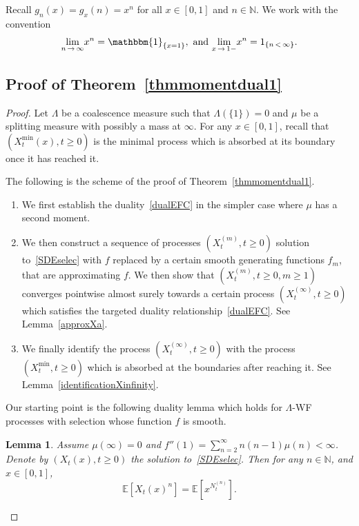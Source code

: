 \documentclass[10pt]{amsart}
\newtheorem{lemm}[theo]{Lemma}\newtheorem{prop}[theo]{Proposition}\newtheorem{coro}[theo]{Corollary}\newtheorem{conj}[theo]{Conjecture}
\theoremstyle{definition}\newtheorem{defi}[theo]{Definition}\newtheorem{rema}[theo]{Remark}\newtheorem{exam}[theo]{Example}\newtheorem{exem}[theo]{Example}\newtheorem{nota}[theo]{Notation}
\newcommand{\bbmun}{\mathbbm{1}}
\newcommand{\bbN}{\mathbb{N}}
\newcommand{\bbE}{\mathbb{E}}
\begin{document}
Recall $g_n(x)=g_x(n)=x^n$ for all $x\in [0,1]$ and $n\in \bbN$. We work with the convention
\begin{equation}\label{convention}
\underset{n\,\rightarrow\,\infty}{\lim} x^{n}=\bbmun_{\{x=1\}}, \text{ and } \underset{x\,\rightarrow\,1-}{\lim}x^{n}=1_{\{n\,<\,\infty\}}.
\end{equation}

\subsection{Proof of Theorem~\ref{thmmomentdual1}}\label{momentdual1}

\begin{proof}
Let $\Lambda$ be a coalescence measure such that $\Lambda(\{1\})=0$ and $\mu$ be a splitting measure with possibly a mass at $\infty$. For any $x\in [0,1]$, recall that $(X_t^{\min}(x),t\geq 0)$ is the minimal process which is absorbed at its boundary once it has reached it.



The following is the scheme of the proof of Theorem~\ref{thmmomentdual1}.
\begin{enumerate}
\item\label{sect4.1step1} We first establish the duality~\eqref{dualEFC} in the simpler case where $\mu$ has a second moment.
\item\label{sect4.1step2} We then construct a sequence of processes $(X_t^{(m)},t\geq 0)$ solution to~\eqref{SDEselec} with $f$ replaced by a certain smooth generating functions $f_m$, that are approximating $f$. We then show that $(X_t^{(m)},t\geq 0,m\geq 1)$ converges pointwise almost surely towards a certain process $(X_t^{(\infty)},t\geq 0)$ which satisfies the targeted duality relationship~\eqref{dualEFC}. See Lemma~\ref{approxXa}.
\item\label{sect4.1step3} We finally identify the process $(X_t^{(\infty)},t\geq 0)$ with the process $(X_t^{\min},t\geq 0)$ which is absorbed at the boundaries after reaching it. See Lemma~\ref{identificationXinfinity}.
\end{enumerate}
Our starting point is the following duality lemma which holds for $\Lambda$-WF processes with selection whose function $f$ is smooth.


\begin{lemm}\label{dualfinitemoment}
Assume $\mu(\infty)=0$ and $f''(1)=\sum_{n=2}^{\infty}n(n-1)\mu(n)<\infty$. Denote by $(X_t(x),t\geq 0)$ the solution to~\eqref{SDEselec}. Then for any $n\in \bbN$, and $x\in [0,1]$,
\begin{equation}\label{dualmoment1}
\bbE\left[X_t(x)^n\right]=\bbE\left[x^{N^{(n)}_t}\right].
\end{equation}
\end{lemm}


\end{proof}
\end{document}
